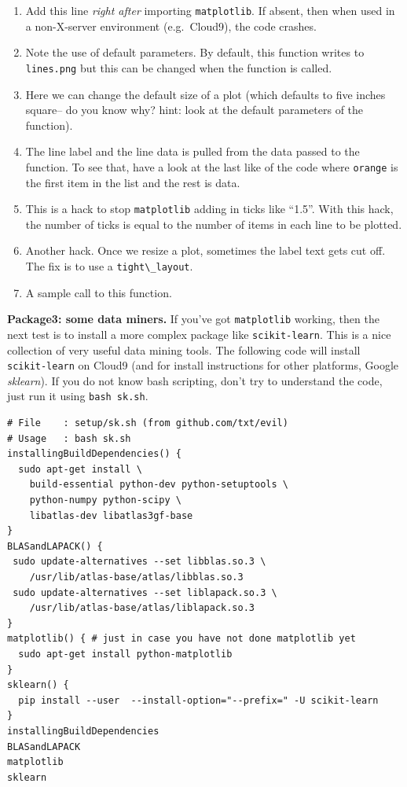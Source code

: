 \begin{enumerate}
\def\labelenumi{\arabic{enumi}.}
\itemsep1pt\parskip0pt
\item
  Add this line \emph{right after} importing \texttt{matplotlib}. If
  absent, then when used in a non-X-server environment (e.g.~Cloud9),
  the code crashes.
\item
  Note the use of default parameters. By default, this function writes
  to \texttt{lines.png} but this can be changed when the function is
  called.
\item
  Here we can change the default size of a plot (which defaults to five
  inches square-- do you know why? hint: look at the default parameters
  of the function).
\item
  The line label and the line data is pulled from the data passed to the
  function. To see that, have a look at the last like of the code where
  \texttt{orange} is the first item in the list and the rest is data.
\item
  This is a hack to stop \texttt{matplotlib} adding in ticks like
  ``1.5''. With this hack, the number of ticks is equal to the number of
  items in each line to be plotted.
\item
  Another hack. Once we resize a plot, sometimes the label text gets cut
  off. The fix is to use a \texttt{tight\textbackslash{}\_layout}.
\item
  A sample call to this function.
\end{enumerate}

\textbf{Package3: some data miners.} If you've got \texttt{matplotlib}
working, then the next test is to install a more complex package like
\texttt{scikit-learn}. This is a nice collection of very useful data
mining tools. The following code will install \texttt{scikit-learn} on
Cloud9 (and for install instructions for other platforms, Google
\emph{sklearn}). If you do not know bash scripting, don't try to
understand the code, just run it using \texttt{bash\ sk.sh}.

\begin{lstlisting}
# File    : setup/sk.sh (from github.com/txt/evil)
# Usage   : bash sk.sh
installingBuildDependencies() {
  sudo apt-get install \
    build-essential python-dev python-setuptools \
    python-numpy python-scipy \
    libatlas-dev libatlas3gf-base
}
BLASandLAPACK() { 
 sudo update-alternatives --set libblas.so.3 \
    /usr/lib/atlas-base/atlas/libblas.so.3
 sudo update-alternatives --set liblapack.so.3 \
    /usr/lib/atlas-base/atlas/liblapack.so.3
}
matplotlib() { # just in case you have not done matplotlib yet
  sudo apt-get install python-matplotlib
}
sklearn() {
  pip install --user  --install-option="--prefix=" -U scikit-learn
}
installingBuildDependencies
BLASandLAPACK
matplotlib
sklearn
\end{lstlisting}

